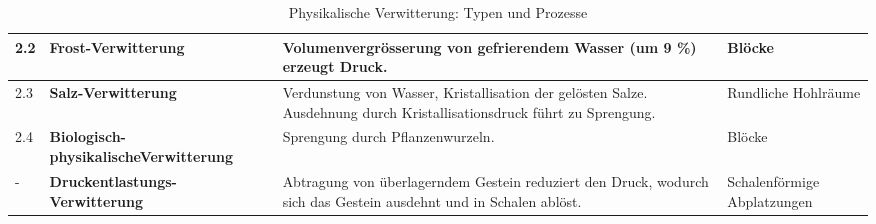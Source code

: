 \begin{myexercise}
\begin{myanswer}
\begin{table}[H]
\begin{tabular}{@{}l|p{4cm}||p{6cm}|p{2.5cm}@{}}
\tiny 2.2 & \textbf{Frost-Verwitterung} & Volumenvergrösserung von gefrierendem Wasser (um 9 \%) erzeugt Druck. & Blöcke \\\midrule
\tiny 2.3 & \textbf{Salz-Verwitterung} & Verdunstung von Wasser, Kristallisation der gelösten Salze. Ausdehnung durch Kristallisationsdruck führt zu Sprengung. & Rundliche Hohlräume \\\midrule
\tiny 2.4 & \textbf{Biologisch-physikalische\newline Verwitterung} & Sprengung durch Pflanzenwurzeln. & Blöcke \\\midrule
\tiny - & \textbf{Druckentlastungs-Verwitterung} & Abtragung von überlagerndem Gestein reduziert den Druck, wodurch sich das Gestein ausdehnt und in Schalen ablöst. & Schalenförmige Abplatzungen \\\bottomrule

\end{tabular}
\caption{Physikalische Verwitterung: Typen und Prozesse}
\end{table}
\end{myanswer}
\end{myexercise}
\newpage
